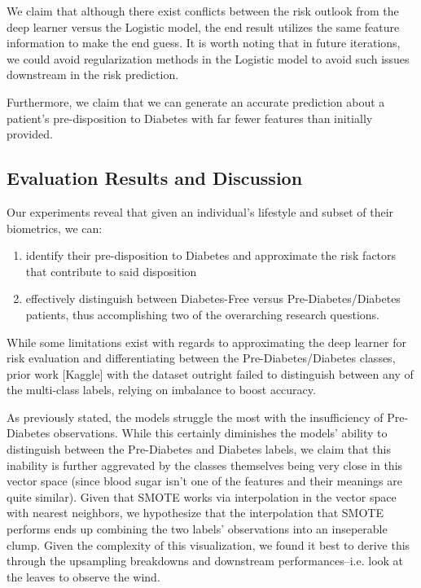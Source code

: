 \documentclass[conference]{IEEEtran}
\begin{document}
    We claim that although there exist conflicts between the risk outlook from the deep learner versus the Logistic model, the end result utilizes the same feature information to make the end guess. It is worth noting that in future iterations, we could avoid regularization methods in the Logistic model to avoid such issues downstream in the risk prediction.

    Furthermore, we claim that we can generate an accurate prediction about a patient's pre-disposition to Diabetes with far fewer features than initially provided.

    \subsection{Evaluation Results and Discussion}
    Our experiments reveal that given an individual's lifestyle and subset of their biometrics, we can:
    \begin{enumerate}[label=\roman*.]
        \item identify their pre-disposition to Diabetes and approximate the risk factors that contribute to said disposition
        
        \item effectively distinguish between Diabetes-Free versus Pre-Diabetes/Diabetes patients, thus accomplishing two of the overarching research questions.
    \end{enumerate}

    While some limitations exist with regards to approximating the deep learner for risk evaluation and differentiating between the Pre-Diabetes/Diabetes classes, prior work [Kaggle] with the dataset outright failed to distinguish between any of the multi-class labels, relying on imbalance to boost accuracy.

    As previously stated, the models struggle the most with the insufficiency of Pre-Diabetes observations. While this certainly diminishes the models' ability to distinguish between the Pre-Diabetes and Diabetes labels, we claim that this inability is further aggrevated by the classes themselves being very close in this vector space (since blood sugar isn't one of the features and their meanings are quite similar). Given that SMOTE works via interpolation in the vector space with nearest neighbors, we hypothesize that the interpolation that SMOTE performs ends up combining the two labels' observations into an inseperable clump. Given the complexity of this visualization, we found it best to derive this through the upsampling breakdowns and downstream performances--i.e. look at the leaves to observe the wind.
\end{document}
